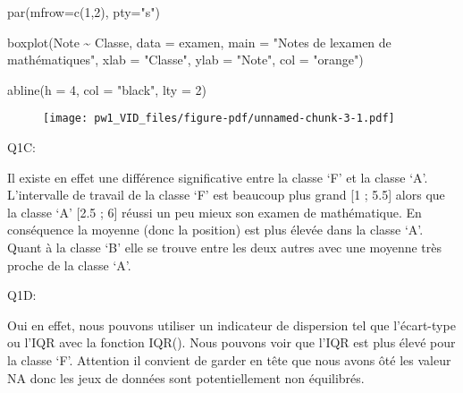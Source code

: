 \documentclass[
  letterpaper,
  DIV=11,
  numbers=noendperiod]{scrartcl}
\newenvironment{Shaded}{}{}
\newcommand{\AttributeTok}[1]{\textcolor[rgb]{0.84,0.23,0.29}{#1}}
\newcommand{\ConstantTok}[1]{\textcolor[rgb]{0.00,0.36,0.77}{#1}}
\newcommand{\DecValTok}[1]{\textcolor[rgb]{0.00,0.36,0.77}{#1}}
\newcommand{\FunctionTok}[1]{\textcolor[rgb]{0.44,0.26,0.76}{#1}}
\newcommand{\NormalTok}[1]{\textcolor[rgb]{0.14,0.16,0.18}{#1}}
\newcommand{\SpecialCharTok}[1]{\textcolor[rgb]{0.00,0.36,0.77}{#1}}
\newcommand{\StringTok}[1]{\textcolor[rgb]{0.01,0.18,0.38}{#1}}
\begin{document}
\begin{Shaded}
\begin{Highlighting}[]
\FunctionTok{par}\NormalTok{(}\AttributeTok{mfrow=}\FunctionTok{c}\NormalTok{(}\DecValTok{1}\NormalTok{,}\DecValTok{2}\NormalTok{), }\AttributeTok{pty=}\StringTok{"s"}\NormalTok{)}

\FunctionTok{boxplot}\NormalTok{(Note }\SpecialCharTok{\textasciitilde{}}\NormalTok{ Classe, }\AttributeTok{data =}\NormalTok{ examen, }\AttributeTok{main =} \StringTok{"Notes de l\textquotesingle{}examen de mathématiques"}\NormalTok{, }\AttributeTok{xlab =} \StringTok{"Classe"}\NormalTok{, }\AttributeTok{ylab =} \StringTok{"Note"}\NormalTok{, }\AttributeTok{col =} \StringTok{"orange"}\NormalTok{)}

\FunctionTok{abline}\NormalTok{(}\AttributeTok{h =} \DecValTok{4}\NormalTok{, }\AttributeTok{col =} \StringTok{"black"}\NormalTok{, }\AttributeTok{lty =} \DecValTok{2}\NormalTok{)}
\end{Highlighting}
\end{Shaded}

\begin{figure}[H]

{\centering \texttt{[image: pw1\_VID\_files/figure-pdf/unnamed-chunk-3-1.pdf]}

}

\end{figure}

Q1C:

Il existe en effet une différence significative entre la classe `F' et
la classe `A'. L'intervalle de travail de la classe `F' est beaucoup
plus grand {[}1 ; 5.5{]} alors que la classe `A' {[}2.5 ; 6{]} réussi un
peu mieux son examen de mathématique. En conséquence la moyenne (donc la
position) est plus élevée dans la classe `A'. Quant à la classe `B' elle
se trouve entre les deux autres avec une moyenne très proche de la
classe `A'.

Q1D:

Oui en effet, nous pouvons utiliser un indicateur de dispersion tel que
l'écart-type ou l'IQR avec la fonction IQR(). Nous pouvons voir que
l'IQR est plus élevé pour la classe `F'. Attention il convient de garder
en tête que nous avons ôté les valeur NA donc les jeux de données sont
potentiellement non équilibrés.

\begin{Shaded}
\end{Shaded}
\end{document}
